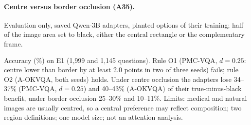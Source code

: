 \paragraph{Centre versus border occlusion (A35).}
Evaluation only, saved Qwen-3B adapters, planted options of their training; half of the image area set to black, either the central rectangle or the complementary frame.
\begin{center}
\footnotesize
\setlength{\tabcolsep}{3pt}
\end{center}
Accuracy (\%) on E1 (1{,}999 and 1{,}145 questions).
Rule O1 (PMC-VQA, $d=0.25$: centre lower than border by at least 2.0 points in two of three seeds) fails; rule O2 (A-OKVQA, both seeds) holds.
Under centre occlusion the adapters lose 34--37\% (PMC-VQA, $d=0.25$) and 40--43\% (A-OKVQA) of their true-minus-black benefit, under border occlusion 25--30\% and 10--11\%.
Limits: medical and natural images are usually centred, so a central preference may reflect composition; two region definitions; one model size; not an attention analysis.

